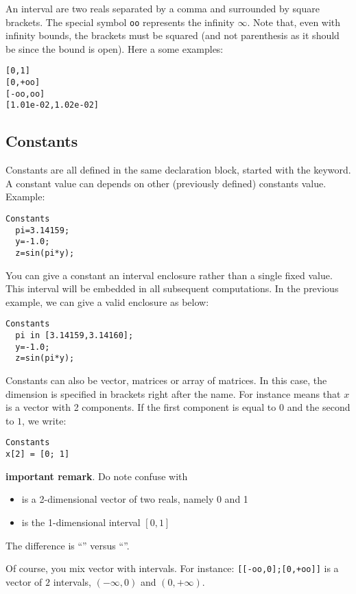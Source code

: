 An interval are two reals separated by a comma
and surrounded by square brackets. The special symbol
{\tt oo} represents the infinity $\infty$.
Note that, even with infinity bounds, the brackets
must be squared (and not parenthesis as it should be since the
bound is open). Here a some examples:

\begin{verbatim}
[0,1]
[0,+oo]
[-oo,oo]
[1.01e-02,1.02e-02]
\end{verbatim}

\subsection{Constants}
Constants are all defined in the same declaration block, 
started with the  keyword.
A constant value can depends on other (previously defined) constants value. Example:

\begin{verbatim}
Constants
  pi=3.14159;
  y=-1.0;
  z=sin(pi*y);
\end{verbatim} 

You can give a constant an interval enclosure rather than a single fixed value.
This interval will be embedded in all subsequent computations.
In the previous example, we can give  a valid enclosure as below:

\begin{verbatim}
Constants
  pi in [3.14159,3.14160];
  y=-1.0;
  z=sin(pi*y);
\end{verbatim}

Constants can also be vector, matrices or array of matrices.
In this case, the dimension is specified in brackets
right after the name. For instance  means that 
$x$ is a vector with 2 components. If the first component is equal
to $0$ and the second to $1$, we write: 
\begin{verbatim}
Constants
x[2] = [0; 1]
\end{verbatim}

{\bf important remark}. Do note confuse
\cf{[0;1]} with \cf{[0,1]}
\begin{itemize}
\item \cf{[0;1]} is a 2-dimensional vector of two reals, namely 0 and 1
\item \cf{[0,1]} is the 1-dimensional interval $[0,1]$
\end{itemize}
The difference is ``\cf{;}'' versus ``\cf{,}''.

Of course, you mix vector with intervals. For instance:
{\tt [[-oo,0];[0,+oo]]} is a vector of $2$ intervals, $(-\infty,0)$ and $(0,+\infty)$.

